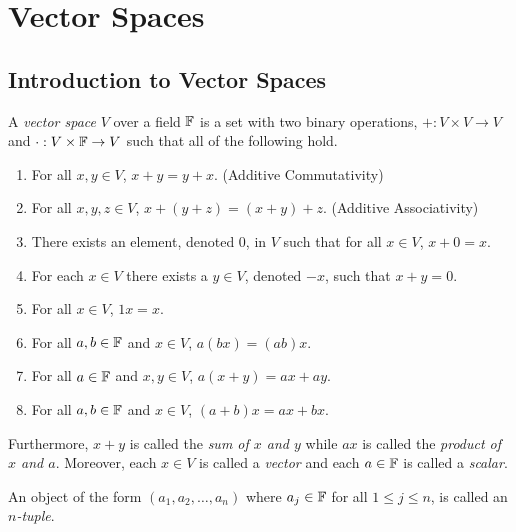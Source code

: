 \section{Vector Spaces}

\subsection{Introduction to Vector Spaces}

\begin{definition}
	A \textit{vector space} $V$ over a field $\mathbb{F}$ is a set with two binary operations, $+:V\times V\rightarrow V$ and $\cdot:V\times\mathbb{F}\rightarrow V$ such that all of the following hold.
	\begin{enumerate}
		\item For all $x,y\in V$, $x+y=y+x$. (Additive Commutativity)
		\item For all $x,y,z\in V$, $x+(y+z)=(x+y)+z$. (Additive Associativity)
		\item There exists an element, denoted 0, in $V$ such that for all $x\in V$, $x+0=x$.
		\item For each $x\in V$ there exists a $y\in V$, denoted $-x$, such that $x+y=0$.
		\item For all $x\in V$, $1x=x$.
		\item For all $a,b\in\mathbb{F}$ and $x\in V$, $a(bx)=(ab)x$.
		\item For all $a\in\mathbb{F}$ and $x,y\in V$, $a(x+y)=ax+ay$.
		\item For all $a,b\in\mathbb{F}$ and $x\in V$, $(a+b)x=ax+bx$.
	\end{enumerate}
	Furthermore, $x+y$ is called the \textit{sum of $x$ and $y$} while $ax$ is called the \textit{product of $x$ and $a$}.
	Moreover, each $x\in V$ is called a \textit{vector} and each $a\in\mathbb{F}$ is called a \textit{scalar}.
\end{definition}

\begin{definition}[$n$-tuple]
	An object of the form $(a_1,a_2,\ldots,a_n)$ where $a_j\in\mathbb{F}$ for all $1\leq j\leq n$, is called an \textit{$n$-tuple}.
\end{definition}

